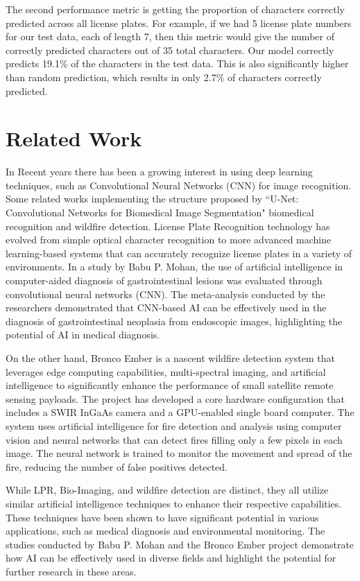 \documentclass[conference]{IEEEtran}
\begin{document}
\par
The second performance metric is getting the proportion of characters correctly predicted across all license plates. For example, if we had 5 license plate numbers for our test data, each of length 7, then this metric would give the number of correctly predicted characters out of 35 total characters. Our model correctly predicts 19.1\% of the characters in the test data. This is also significantly higher than random prediction, which results in only 2.7\% of characters correctly predicted.

\section{Related Work}
\par 
In Recent years there has been a growing interest in using deep learning techniques, such as Convolutional Neural Networks (CNN) for image recognition. Some related works implementing the structure proposed by “U-Net: Convolutional Networks for Biomedical Image Segmentation" biomedical recognition and wildfire detection. License Plate Recognition technology has evolved from simple optical character recognition to more advanced machine learning-based systems that can accurately recognize license plates in a variety of environments. In a study by Babu P. Mohan, the use of artificial intelligence in computer-aided diagnosis of gastrointestinal lesions was evaluated through convolutional neural networks (CNN). The meta-analysis conducted by the researchers demonstrated that CNN-based AI can be effectively used in the diagnosis of gastrointestinal neoplasia from endoscopic images, highlighting the potential of AI in medical diagnosis.
\par 
On the other hand, Bronco Ember is a nascent wildfire detection system that leverages edge computing capabilities, multi-spectral imaging, and artificial intelligence to significantly enhance the performance of small satellite remote sensing payloads. The project has developed a core hardware configuration that includes a SWIR InGaAs camera and a GPU-enabled single board computer. The system uses artificial intelligence for fire detection and analysis using computer vision and neural networks that can detect fires filling only a few pixels in each image. The neural network is trained to monitor the movement and spread of the fire, reducing the number of false positives detected.
\par
While LPR, Bio-Imaging, and wildfire detection are distinct, they all utilize similar artificial intelligence techniques to enhance their respective capabilities. These techniques have been shown to have significant potential in various applications, such as medical diagnosis and environmental monitoring. The studies conducted by Babu P. Mohan and the Bronco Ember project demonstrate how AI can be effectively used in diverse fields and highlight the potential for further research in these areas.
\end{document}
